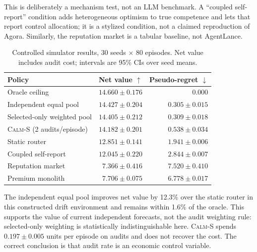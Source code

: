 \documentclass[sigconf,anonymous,review]{acmart}
\newcommand{\calms}{\textsc{Calm-S}}
\begin{document}
This is deliberately a mechanism test, not an LLM benchmark. A ``coupled
self-report'' condition adds heterogeneous optimism to true competence and lets
that report control allocation; it is a stylized condition, not a claimed
reproduction of Agora. Similarly, the reputation market is a tabular baseline,
not AgentLance.

\begin{table}[t]
\caption{Controlled simulator results, 30 seeds $\times$ 80 episodes. Net value
includes audit cost; intervals are 95\% CIs over seed means.}
\label{tab:main}
\centering
\small
\begin{tabular}{lrr}
\toprule
Policy & Net value $\uparrow$ & Pseudo-regret $\downarrow$\\
\midrule
Oracle ceiling & $14.660\pm0.176$ & $0.000$\\
Independent equal pool & $14.427\pm0.204$ & $0.305\pm0.015$\\
Selected-only weighted pool & $14.405\pm0.212$ & $0.309\pm0.018$\\
\calms{} (2 audits/episode) & $14.182\pm0.201$ & $0.538\pm0.034$\\
Static router & $12.851\pm0.141$ & $1.941\pm0.006$\\
Coupled self-report & $12.045\pm0.220$ & $2.844\pm0.007$\\
Reputation market & $7.366\pm0.416$ & $7.520\pm0.410$\\
Premium monolith & $7.706\pm0.075$ & $6.778\pm0.017$\\
\bottomrule
\end{tabular}
\end{table}

The independent equal pool improves net value by 12.3\% over the static router
in this constructed drift environment and remains within 1.6\% of the oracle.
This supports the value of current independent forecasts, not the audit weighting
rule: selected-only weighting is statistically indistinguishable here. \calms{}
spends $0.197\pm0.005$ units per episode on audits and does not recover the cost.
The correct conclusion is that audit rate is an economic control variable.
\end{document}

